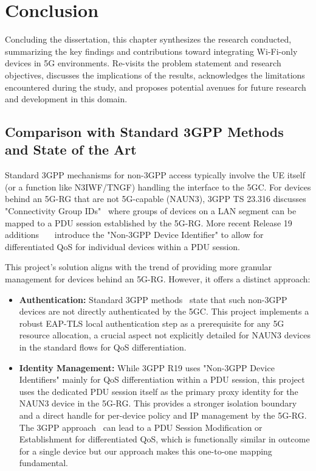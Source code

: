 \chapter{Conclusion}%
\label{chapter:conclusion}

\begin{introduction}
Concluding the dissertation, this chapter synthesizes the research conducted, summarizing the key findings and contributions toward integrating Wi-Fi-only devices in \ac{5G} environments. Re-visits the problem statement and research objectives, discusses the implications of the results, acknowledges the limitations encountered during the study, and proposes potential avenues for future research and development in this domain.
\end{introduction}

\section{Comparison with Standard \acs{3GPP} Methods and State of the Art}

Standard \ac{3GPP} mechanisms for non-\ac{3GPP} access typically involve the \ac{UE} itself (or a function like \ac{N3IWF}/\ac{TNGF}) handling the interface to the \ac{5GC}. For devices behind an \ac{5G-RG} that are not \ac{5G}-capable (\ac{NAUN3}), \ac{3GPP} TS 23.316 discusses "Connectivity Group IDs"~\cite{23.316-p27} where groups of devices on a \ac{LAN} segment can be mapped to a \ac{PDU} session established by the \ac{5G-RG}. More recent Release 19 additions~\cite{23.316-p29}~\cite{23.316-p95}~\cite{23.501-p564} introduce the "Non-\ac{3GPP} Device Identifier" to allow for differentiated \ac{QoS} for individual devices within a \ac{PDU} session.

This project's solution aligns with the trend of providing more granular management for devices behind an \ac{5G-RG}. However, it offers a distinct approach:

\begin{itemize}
    \item \textbf{Authentication:} Standard \ac{3GPP} methods~\cite{23.501-p564} state that such non-\ac{3GPP} devices are not directly authenticated by the \ac{5GC}. This project implements a robust \ac{EAP-TLS} local authentication step as a prerequisite for any \ac{5G} resource allocation, a crucial aspect not explicitly detailed for \ac{NAUN3} devices in the standard flows for \ac{QoS} differentiation.

    \item \textbf{Identity Management:} While \ac{3GPP} R19 uses "Non-\ac{3GPP} Device Identifiers" mainly for \ac{QoS} differentiation within a \ac{PDU} session, this project uses the dedicated \ac{PDU} session itself as the primary proxy identity for the \ac{NAUN3} device in the \ac{5G-RG}. This provides a stronger isolation boundary and a direct handle for per-device policy and \ac{IP} management by the \ac{5G-RG}. The \ac{3GPP} approach~\cite{23.316-p95} can lead to a \ac{PDU} Session Modification or Establishment for differentiated \ac{QoS}, which is functionally similar in outcome for a single device but our approach makes this one-to-one mapping fundamental.
\end{itemize}

